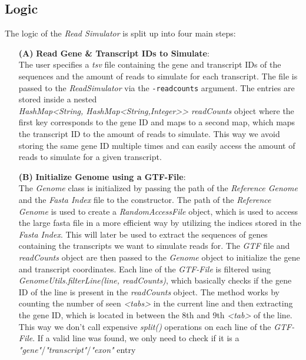 \documentclass[12pt]{article}
\begin{document}
\subsection{Logic}
The logic of the \textit{Read Simulator} is split up into four main steps:
\begin{enumerate}
	\item[\textbf{(A)}] \textbf{Read Gene \& Transcript IDs to Simulate}:\\
		The user specifies a \textit{tsv} file containing the gene and transcript IDs of the sequences and the
		amount of reads to simulate for each transcript. The file is passed to the \textit{ReadSimulator}
		via the \texttt{-readcounts} argument. The entries are stored inside a nested \\
		\textit{HashMap<String, HashMap<String,Integer>\hspace{0.1mm}> readCounts} object where
		the first key corresponds to the gene ID and maps to a second map, which maps the transcript ID to the amount of reads to simulate.
		This way we avoid storing the same gene ID multiple times and can easily access the amount of reads to simulate for a given transcript.
	\item[\textbf{(B)}] \textbf{Initialize Genome using a GTF-File}:\\
		The \textit{Genome} class is initialized by passing the path of the \textit{Reference Genome} and the \textit{Fasta Index} file to the constructor.
		The path of the \textit{Reference Genome} is used to create a \textit{RandomAccessFile} object, which is used to
		access the large fasta file in a more efficient way by utilizing the indices stored in the \textit{Fasta Index}.
		This will later be used to extract the sequences of genes containing the transcripts we want to simulate reads for.
		The \textit{GTF} file and \textit{readCounts} object are then passed to the \textit{Genome} object to initialize the gene and transcript coordinates.
		Each line of the \textit{GTF-File} is filtered using \textit{GenomeUtils.filterLine(line, readCounts)}, which
		basically checks if the gene ID of the line is present in the \textit{readCounts} object.
		The method works by counting the number of seen \textit{<tabs>} in the current line and then extracting the gene ID,
		which is located in between the 8th and 9th \textit{<tab>} of the line. This way we don't
		call expensive \textit{split()} operations on each line of the \textit{GTF-File}.
		If a valid line was found, we only need to check if it is a \textit{"gene"}/\textit{"transcript"}/\textit{"exon"} entry

\end{enumerate}
\end{document}
